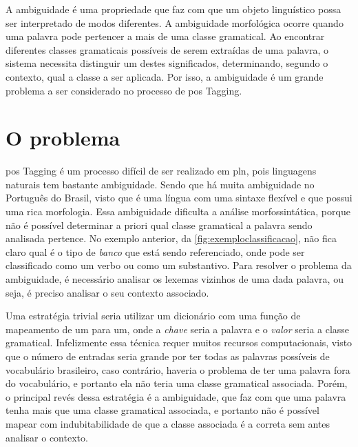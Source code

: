 A ambiguidade é uma propriedade que faz com que um objeto linguístico possa ser interpretado de modos diferentes. A ambiguidade morfológica ocorre quando uma palavra pode pertencer a mais de uma classe gramatical. Ao encontrar diferentes classes gramaticais possíveis de serem extraídas de uma palavra, o sistema necessita distinguir um destes significados, determinando, segundo o contexto, qual a classe a ser aplicada. Por isso, a ambiguidade é um grande problema a ser considerado no processo de \ac{pos} Tagging. 




\section{O problema}\label{sec:oproblema}

\ac{pos} Tagging é um processo difícil de ser realizado em \ac{pln}, pois linguagens naturais tem bastante ambiguidade. Sendo que há muita ambiguidade no Português do Brasil, visto que é uma língua com uma sintaxe flexível e que possui uma rica morfologia. Essa ambiguidade dificulta a análise morfossintática, porque não é possível determinar a priori qual classe gramatical a palavra sendo analisada pertence. No exemplo anterior, da \autoref{fig:exemploclassificacao}, não fica claro qual é o tipo de \textit{banco} que está sendo referenciado, onde pode ser classificado como um verbo ou como um substantivo. Para resolver o problema da ambiguidade, é necessário analisar os lexemas vizinhos de uma dada palavra, ou seja, é preciso analisar o seu contexto associado.

Uma estratégia trivial seria utilizar um dicionário com uma função de mapeamento de um para um, onde a \textit{chave} seria a palavra e o \textit{valor} seria a classe gramatical. Infelizmente essa técnica requer muitos recursos computacionais, visto que o número de entradas seria grande por ter todas as palavras possíveis de vocabulário brasileiro, caso contrário, haveria o problema de ter uma palavra fora do vocabulário, e portanto ela não teria uma classe gramatical associada. Porém, o principal revés dessa estratégia é a ambiguidade, que faz com que uma palavra tenha mais que uma classe gramatical associada, e portanto não é possível mapear com indubitabilidade de que a classe associada é a correta sem antes analisar o contexto.


